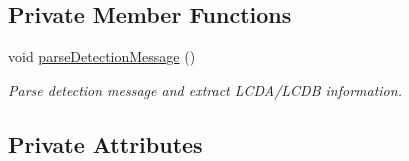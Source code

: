 \subsection*{Private Member Functions}
\begin{DoxyCompactItemize}
\item 
void \hyperlink{class_anaconda_detection_belief_a42f8d5048b0409107a9b10e302c35a15}{parseDetectionMessage} ()
\begin{DoxyCompactList}\small\item\em Parse detection message and extract LCDA/LCDB information. \end{DoxyCompactList}\end{DoxyCompactItemize}
\subsection*{Private Attributes}
